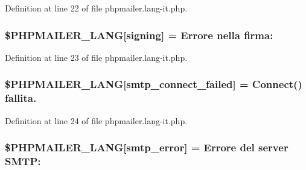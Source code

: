 Definition at line 22 of file phpmailer.\+lang-\/it.\+php.

\subsubsection[{\texorpdfstring{\$\+P\+H\+P\+M\+A\+I\+L\+E\+R\+\_\+\+L\+A\+NG}{$PHPMAILER_LANG}}]{\setlength{\rightskip}{0pt plus 5cm}\$P\+H\+P\+M\+A\+I\+L\+E\+R\+\_\+\+L\+A\+NG\mbox{[}\textquotesingle{}signing\textquotesingle{}\mbox{]} = \textquotesingle{}Errore nella firma\+: \textquotesingle{}}\hypertarget{phpmailer_8lang-it_8php_a68e437bdb9b968a5a67320f03d231565}{}\label{phpmailer_8lang-it_8php_a68e437bdb9b968a5a67320f03d231565}


Definition at line 23 of file phpmailer.\+lang-\/it.\+php.

\subsubsection[{\texorpdfstring{\$\+P\+H\+P\+M\+A\+I\+L\+E\+R\+\_\+\+L\+A\+NG}{$PHPMAILER_LANG}}]{\setlength{\rightskip}{0pt plus 5cm}\$P\+H\+P\+M\+A\+I\+L\+E\+R\+\_\+\+L\+A\+NG\mbox{[}\textquotesingle{}smtp\+\_\+connect\+\_\+failed\textquotesingle{}\mbox{]} =  Connect() fallita.\textquotesingle{}}\hypertarget{phpmailer_8lang-it_8php_a7b321d4ca1e9df702403ed4c61aa0980}{}\label{phpmailer_8lang-it_8php_a7b321d4ca1e9df702403ed4c61aa0980}


Definition at line 24 of file phpmailer.\+lang-\/it.\+php.

\subsubsection[{\texorpdfstring{\$\+P\+H\+P\+M\+A\+I\+L\+E\+R\+\_\+\+L\+A\+NG}{$PHPMAILER_LANG}}]{\setlength{\rightskip}{0pt plus 5cm}\$P\+H\+P\+M\+A\+I\+L\+E\+R\+\_\+\+L\+A\+NG\mbox{[}\textquotesingle{}smtp\+\_\+error\textquotesingle{}\mbox{]} = \textquotesingle{}Errore del server S\+M\+T\+P\+: \textquotesingle{}}\hypertarget{phpmailer_8lang-it_8php_a7d9cffba1e669c845f8a4c891ee50064}{}\label{phpmailer_8lang-it_8php_a7d9cffba1e669c845f8a4c891ee50064}


